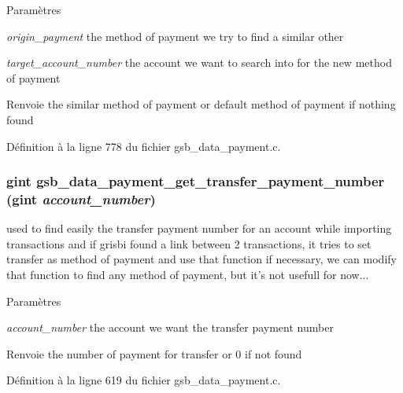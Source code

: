 \begin{DoxyParams}{Paramètres}
\item[{\em origin\_\-payment}]the method of payment we try to find a similar other \item[{\em target\_\-account\_\-number}]the account we want to search into for the new method of payment\end{DoxyParams}
\begin{DoxyReturn}{Renvoie}
the similar method of payment or default method of payment if nothing found 
\end{DoxyReturn}


Définition à la ligne 778 du fichier gsb\_\-data\_\-payment.c.

\subsubsection[{gsb\_\-data\_\-payment\_\-get\_\-transfer\_\-payment\_\-number}]{\setlength{\rightskip}{0pt plus 5cm}gint gsb\_\-data\_\-payment\_\-get\_\-transfer\_\-payment\_\-number (gint {\em account\_\-number})}\label{gsb__data__payment_8h_a11b56161aa3440cc9367c89a72c595d5}
used to find easily the transfer payment number for an account while importing transactions and if grisbi found a link between 2 transactions, it tries to set transfer as method of payment and use that function if necessary, we can modify that function to find any method of payment, but it's not usefull for now...


\begin{DoxyParams}{Paramètres}
\item[{\em account\_\-number}]the account we want the transfer payment number\end{DoxyParams}
\begin{DoxyReturn}{Renvoie}
the number of payment for transfer or 0 if not found 
\end{DoxyReturn}


Définition à la ligne 619 du fichier gsb\_\-data\_\-payment.c.

